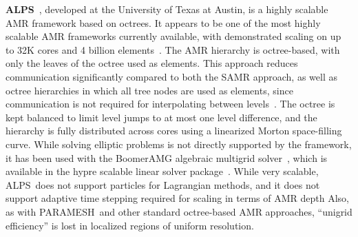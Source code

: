 \documentclass[11pt,letterpaper]{article}
\newcommand{\paramesh}{\textsf{PARAMESH}}
\newcommand{\alps}{\textsf{ALPS}}
\newcommand{\code}[1]{\textsf{#1}}
\begin{document}
\textbf{\alps}~\cite{BuBu09}, developed at the University of Texas at
Austin, is a highly scalable AMR framework based on octrees.  It
appears to be one of the most highly scalable AMR frameworks currently
available, with demonstrated scaling on up to 32K cores and 4 billion
elements~\cite{BuGh08}.
%
The AMR hierarchy is octree-based, with only the leaves of the octree
used as elements.  This approach reduces communication significantly
compared to both the SAMR approach, as well as octree hierarchies in
which all tree nodes are used as elements, since communication is not
required for interpolating between levels~\cite{BuGh08b}.  The octree
is kept balanced to limit level jumps to at most one level difference,
and the hierarchy is fully distributed across cores using a linearized
Morton space-filling curve.  While solving elliptic problems is not
directly supported by the framework, it has been used with the
\code{BoomerAMG} algebraic multigrid solver~\cite{HeYa02}, which is
available in the \code{hypre} scalable linear solver
package~\cite{FaJo06}.
%
%
While very scalable, \alps\ does not support particles for Lagrangian
methods, and it does not support adaptive time stepping required for
scaling in terms of AMR depth
Also, as with \paramesh\ and other standard octree-based AMR
approaches, ``unigrid efficiency'' is lost in localized regions of
uniform resolution.

\end{document}
